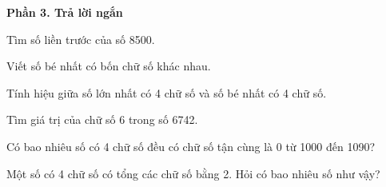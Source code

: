 \textbf{Phần 3. Trả lời ngắn}

\begin{ex} %
Tìm số liền trước của số 8500.
\end{ex}

\begin{ex} %
Viết số bé nhất có bốn chữ số khác nhau.
\end{ex}

\begin{ex} %
Tính hiệu giữa số lớn nhất có 4 chữ số và số bé nhất có 4 chữ số.
\end{ex}

\begin{ex} %
Tìm giá trị của chữ số 6 trong số 6742.
\end{ex}

\begin{ex} %
Có bao nhiêu số có 4 chữ số đều có chữ số tận cùng là 0 từ 1000 đến 1090?
\end{ex}

\begin{ex} %
Một số có 4 chữ số có tổng các chữ số bằng 2. Hỏi có bao nhiêu số như vậy?
\end{ex}
